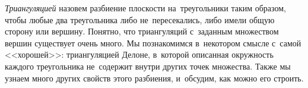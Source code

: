 



\emph{Триангуляцией} назовем разбиение плоскости на~треугольники таким образом,
чтобы любые два треугольника либо не~пересекались, либо имели общую сторону или
вершину.
Понятно, что триангуляций с~заданным множеством вершин существует очень много.
Мы познакомимся в~некотором смысле с~самой <<хорошей>>:
триангуляцией Делоне, в~которой описанная окружность каждого треугольника
не~содержит внутри других точек множества.
Также мы узнаем много других свойств этого разбиения, и~обсудим, как можно его
строить.

